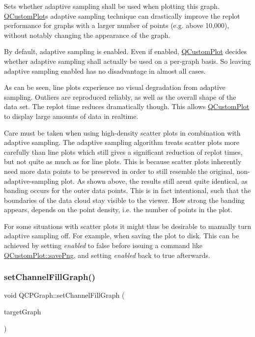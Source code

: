 Sets whether adaptive sampling shall be used when plotting this graph. \hyperlink{classQCustomPlot}{Q\+Custom\+Plot}\textquotesingle{}s adaptive sampling technique can drastically improve the replot performance for graphs with a larger number of points (e.\+g. above 10,000), without notably changing the appearance of the graph.

By default, adaptive sampling is enabled. Even if enabled, \hyperlink{classQCustomPlot}{Q\+Custom\+Plot} decides whether adaptive sampling shall actually be used on a per-\/graph basis. So leaving adaptive sampling enabled has no disadvantage in almost all cases.

 As can be seen, line plots experience no visual degradation from adaptive sampling. Outliers are reproduced reliably, as well as the overall shape of the data set. The replot time reduces dramatically though. This allows \hyperlink{classQCustomPlot}{Q\+Custom\+Plot} to display large amounts of data in realtime.

 Care must be taken when using high-\/density scatter plots in combination with adaptive sampling. The adaptive sampling algorithm treats scatter plots more carefully than line plots which still gives a significant reduction of replot times, but not quite as much as for line plots. This is because scatter plots inherently need more data points to be preserved in order to still resemble the original, non-\/adaptive-\/sampling plot. As shown above, the results still aren\textquotesingle{}t quite identical, as banding occurs for the outer data points. This is in fact intentional, such that the boundaries of the data cloud stay visible to the viewer. How strong the banding appears, depends on the point density, i.\+e. the number of points in the plot.

For some situations with scatter plots it might thus be desirable to manually turn adaptive sampling off. For example, when saving the plot to disk. This can be achieved by setting {\itshape enabled} to false before issuing a command like \hyperlink{classQCustomPlot_ac92cc9256d12f354b40a4be4600b5fb9}{Q\+Custom\+Plot\+::save\+Png}, and setting {\itshape enabled} back to true afterwards. \mbox{\label{classQCPGraph_a2d03156df1b64037a2e36cfa50351ca3}} 
\subsubsection{\texorpdfstring{set\+Channel\+Fill\+Graph()}{setChannelFillGraph()}}
{\footnotesize\ttfamily void Q\+C\+P\+Graph\+::set\+Channel\+Fill\+Graph (\begin{DoxyParamCaption}\item[{\hyperlink{classQCPGraph}{Q\+C\+P\+Graph} $\ast$}]{target\+Graph }\end{DoxyParamCaption})}


